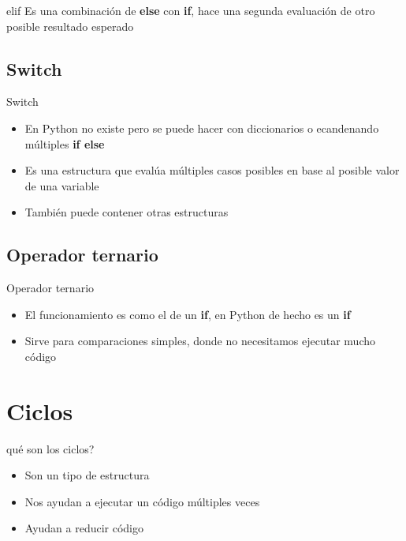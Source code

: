 \documentclass{beamer}
\begin{document}
	\begin{frame}{elif}
		Es una combinaci\'on de \textbf{else} con \textbf{if}, hace una segunda evaluaci\'on de otro posible resultado esperado
	\end{frame}
	
	\subsection{Switch}
	
	\begin{frame}{Switch}
		\begin{itemize}
			\item En Python no existe pero se puede hacer con diccionarios o ecandenando m\'ultiples \textbf{if else}
			\item Es una estructura que eval\'ua m\'ultiples casos posibles en base al posible valor de una variable
			\item Tambi\'en puede contener otras estructuras
		\end{itemize}
	\end{frame}
	
	\subsection{Operador ternario}
	
	\begin{frame}{Operador ternario}
		\begin{itemize}
			\item El funcionamiento es como el de un \textbf{if}, en Python de hecho es un \textbf{if}
			\item Sirve para comparaciones simples, donde no necesitamos ejecutar mucho c\'odigo
		\end{itemize}
	\end{frame}
	
	\section{Ciclos}
	
	\begin{frame}{\textquestiondown qu\'e son los ciclos?}
		\begin{itemize}
			\item Son un tipo de estructura
			\item Nos ayudan a ejecutar un c\'odigo m\'ultiples veces
			\item Ayudan a reducir c\'odigo
		\end{itemize}
	\end{frame}
	
\end{document}
